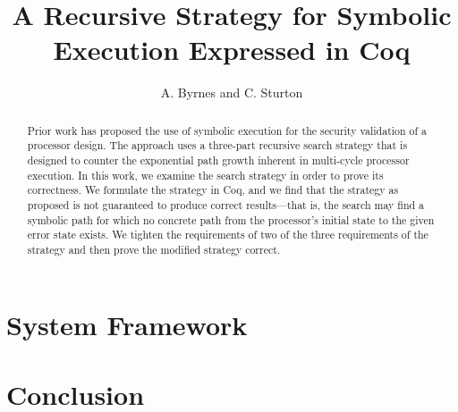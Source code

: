 \documentclass[a4paper]{article}
\title{A Recursive Strategy for Symbolic Execution Expressed in Coq}
\author{A. Byrnes and C. Sturton}
\begin{document}
\maketitle

\begin{abstract}
Prior work has proposed the use of symbolic execution for the security
validation of a processor design. The approach uses a three-part recursive search strategy
that is designed to counter the exponential path growth inherent in multi-cycle
processor execution. In this work, we examine the search strategy in order to prove its correctness. We formulate the
strategy in Coq, and we find that the
strategy as proposed is not guaranteed to produce correct results---that is, the
search may find a symbolic path for which no concrete path from the processor's initial state
to the given error state exists. We tighten the requirements of two of the three
requirements of the strategy and then prove the modified strategy correct. 
\end{abstract}




\section{System Framework}

\section{Conclusion}






\end{document}
